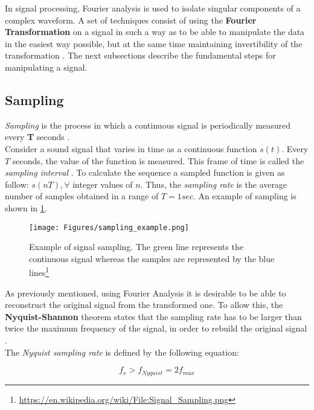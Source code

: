 \noindent In signal processing, Fourier analysis is used to isolate singular components of a complex waveform. A set of techniques consist of using the \textbf{Fourier Transformation} on a signal in such a way as to be able to manipulate the data in the easiest way possible, but at the same time maintaining invertibility of the transformation \cite{rabiner1975theory}. The next subsections describe the fundamental steps for manipulating a signal.

\subsection{Sampling}
\label{ssubs:sampling}

\textit{Sampling} is the process in which a continuous signal is periodically measured every \textbf{T} seconds \cite{orfanidis1995introduction}. \\
\noindent Consider a sound signal that varies in time as a continuous function $s(t)$. Every $T$ seconds, the value of the function is measured. This frame of time is called the \textit{sampling interval} \cite{weik2012communications}. To calculate the sequence a sampled function is given as follow: $s(nT), \forall$ integer values of $n$. Thus, the \textit{sampling rate} is the average number of samples obtained in a range of $T = 1sec$. An example of sampling is shown in \ref{fig:sampling_ex}.

\begin{figure}[!ht]
	\centering
	\texttt{[image: Figures/sampling\_example.png]}
	\caption{Example of signal sampling. The green line represents the continuous signal whereas the samples are represented by the blue lines\footnote{\url{https://en.wikipedia.org/wiki/File:Signal_Sampling.png}}}
	\label{fig:sampling_ex}
\end{figure}

\noindent As previously mentioned, using Fourier Analysis it is desirable to be able to reconstruct the original signal from the transformed one. To allow this, the \textbf{Nyquist-Shannon} theorem states that the sampling rate has to be larger than twice the maximum frequency of the signal, in order to rebuild the original signal \cite{sampling_illinois}.\\
\noindent The \textit{Nyquist sampling rate} is defined by the following equation:

\begin{equation}
f_{s} > f_{Nyquist} = 2f_{max}
\end{equation}


